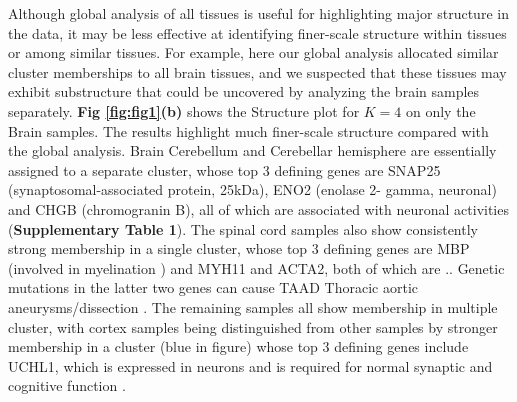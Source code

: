 
Although global analysis of all tissues is useful for highlighting major structure in the data, it may be less effective at identifying finer-scale structure within tissues or among similar tissues. For example, here our global analysis allocated similar cluster memberships to all brain tissues,  and we suspected that these tissues may exhibit substructure that could be uncovered by analyzing the brain samples separately.  \textbf{Fig \ref{fig:fig1}(b)} shows the Structure plot for $K=4$ on only the Brain samples. The results highlight much finer-scale structure compared with the global analysis. Brain Cerebellum and Cerebellar hemisphere are essentially assigned to a separate cluster, whose top 3 defining genes are SNAP25 (synaptosomal-associated protein, 25kDa), ENO2 (enolase 2- gamma, neuronal) and CHGB (chromogranin B),  all of which are associated with neuronal activities (\textbf{Supplementary Table 1}). %
The spinal cord samples also show consistently strong membership in a single cluster, whose top 3 defining genes are MBP  (involved in myelination \cite{Hu2016}) and MYH11 and ACTA2, both of which are .. Genetic mutations in the latter two genes can cause TAAD Thoracic aortic aneurysms/dissection \cite{Renard2016}. The remaining samples all show membership in multiple cluster, with cortex samples being distinguished from other samples by stronger membership in a cluster (blue in figure) whose top 3 defining genes include UCHL1, which is expressed in neurons and is required for normal synaptic and cognitive function \cite{Gong2006}.


